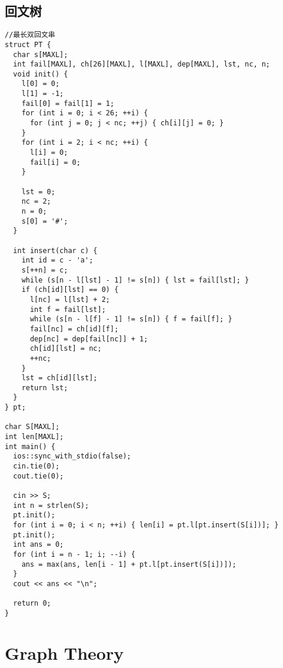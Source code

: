 \documentclass[twoside]{article}
\begin{document}
\subsection{回文树}
\begin{lstlisting}
//最长双回文串
struct PT {
  char s[MAXL];
  int fail[MAXL], ch[26][MAXL], l[MAXL], dep[MAXL], lst, nc, n;
  void init() {
    l[0] = 0;
    l[1] = -1;
    fail[0] = fail[1] = 1;
    for (int i = 0; i < 26; ++i) {
      for (int j = 0; j < nc; ++j) { ch[i][j] = 0; }
    }
    for (int i = 2; i < nc; ++i) {
      l[i] = 0;
      fail[i] = 0;
    }

    lst = 0;
    nc = 2;
    n = 0;
    s[0] = '#';
  }

  int insert(char c) {
    int id = c - 'a';
    s[++n] = c;
    while (s[n - l[lst] - 1] != s[n]) { lst = fail[lst]; }
    if (ch[id][lst] == 0) {
      l[nc] = l[lst] + 2;
      int f = fail[lst];
      while (s[n - l[f] - 1] != s[n]) { f = fail[f]; }
      fail[nc] = ch[id][f];
      dep[nc] = dep[fail[nc]] + 1;
      ch[id][lst] = nc;
      ++nc;
    }
    lst = ch[id][lst];
    return lst;
  }
} pt;

char S[MAXL];
int len[MAXL];
int main() {
  ios::sync_with_stdio(false);
  cin.tie(0);
  cout.tie(0);

  cin >> S;
  int n = strlen(S);
  pt.init();
  for (int i = 0; i < n; ++i) { len[i] = pt.l[pt.insert(S[i])]; }
  pt.init();
  int ans = 0;
  for (int i = n - 1; i; --i) {
    ans = max(ans, len[i - 1] + pt.l[pt.insert(S[i])]);
  }
  cout << ans << "\n";

  return 0;
}

\end{lstlisting}

\section{Graph Theory}
\end{document}
